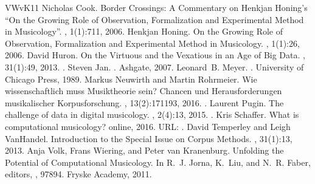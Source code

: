 \documentclass[letterpaper,10pt,english]{sphinxmanual}
\begin{document}
\begin{sphinxthebibliography}{VWvK11}
Nicholas Cook. Border Crossings: A Commentary on Henkjan Honing’s “On the Growing Role of Observation, Formalization and Experimental Method in Musicology”. , 1(1):7\textendash{}11, 2006.
Henkjan Honing. On the Growing Role of Observation, Formalization and Experimental Method in Musicology. , 1(1):2\textendash{}6, 2006.
David Huron. On the Virtuous and the Vexatious in an Age of Big Data. , 31(1):4\textendash{}9, 2013. .
Steven Jan. . Ashgate, 2007.
Leonard B. Meyer. . University of Chicago Press, 1989.
Markus Neuwirth and Martin Rohrmeier. Wie wissenschaftlich muss Musiktheorie sein? Chancen und Herausforderungen musikalischer Korpusforschung. , 13(2):171\textendash{}193, 2016. .
Laurent Pugin. The challenge of data in digital musicology. , 2(4):1\textendash{}3, 2015. .
Kris Schaffer. What is computational musicology? online, 2016. URL: .
David Temperley and Leigh VanHandel. Introduction to the Special Issue on Corpus Methods. , 31(1):1\textendash{}3, 2013.
Anja Volk, Frans Wiering, and Peter van Kranenburg. Unfolding the Potential of Computational Musicology. In R. J. Jorna, K. Liu, and N. R. Faber, editors, , 978\textendash{}94. Fryske Academy, 2011.
\end{sphinxthebibliography}



\renewcommand{\indexname}{Index}
\printindex
\end{document}
